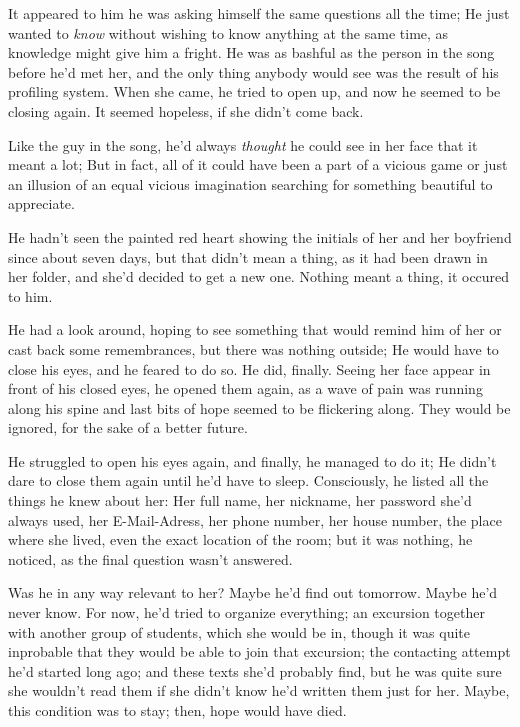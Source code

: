 It appeared to him he was asking himself the same questions all the time; He just wanted to \emph{know} without wishing to know anything at the same time, as knowledge might give him a fright. 
He was as bashful as the person in the song before he'd met her, and the only thing anybody would see was the result of his profiling system. When she came, he tried to open up, and now he seemed to be closing again.
It seemed hopeless, if she didn't come back.

Like the guy in the song, he'd always \emph{thought} he could see in her face that it meant a lot; But in fact, all of it could have been a part of a vicious game or just an illusion of an equal vicious imagination searching for something beautiful to appreciate.

He hadn't seen the painted red heart showing the initials of her and her boyfriend since about seven days, but that didn't mean a thing, as it had been drawn in her folder, and she'd decided to get a new one.
Nothing meant a thing, it occured to him.

He had a look around, hoping to see something that would remind him of her or cast back some remembrances, but there was nothing outside; He would have to close his eyes, and he feared to do so. 
He did, finally. Seeing her face appear in front of his closed eyes, he opened them again, as a wave of pain was running along his spine and last bits of hope seemed to be flickering along. 
They would be ignored, for the sake of a better future.

He struggled to open his eyes again, and finally, he managed to do it; He didn't dare to close them again until he'd have to sleep. 
Consciously, he listed all the things he knew about her: Her full name, her nickname, her password she'd always used, her E-Mail-Adress, her phone number, her house number, the place where she lived, even the exact location of the room; but it was nothing, he noticed, as the final question wasn't answered.

Was he in any way relevant to her?
Maybe he'd find out tomorrow. 
Maybe he'd never know. 
For now, he'd tried to organize everything; an excursion together with another group of students, which she would be in, though it was quite inprobable that they would be able to join that excursion; the contacting attempt he'd started long ago; and these texts she'd probably find, but he was quite sure she wouldn't read them if she didn't know he'd written them just for her. 
Maybe, this condition was to stay; then, hope would have died.

